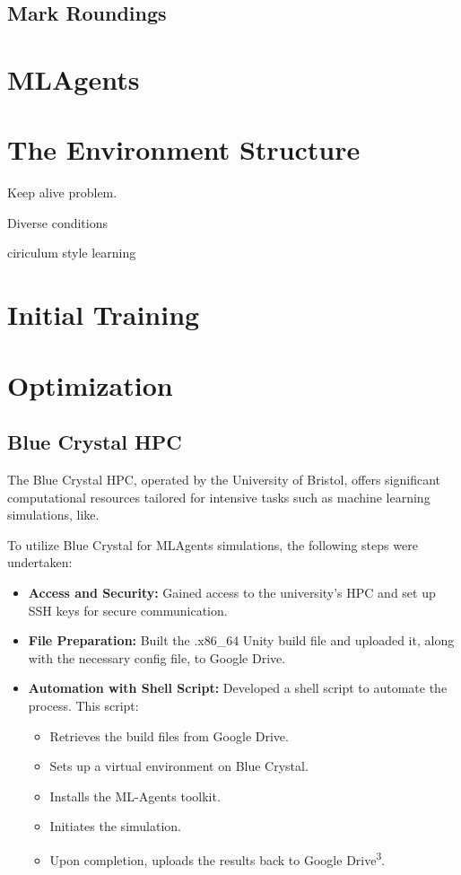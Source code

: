 \subsection{Mark Roundings}

\section{MLAgents}

\section{The Environment Structure}
Keep alive problem.

Diverse conditions

ciriculum style learning

\section{Initial Training}

\section{Optimization}

\subsection{Blue Crystal HPC}

The Blue Crystal HPC, operated by the University of Bristol, offers significant computational resources tailored for intensive tasks such as machine learning simulations, like.


To utilize Blue Crystal for MLAgents simulations, the following steps were undertaken:

\begin{itemize}
    \item \textbf{Access and Security:} Gained access to the university's HPC and set up SSH keys for secure communication.
    \item \textbf{File Preparation:} Built the .x86\_64 Unity build file and uploaded it, along with the necessary config file, to Google Drive.
    \item \textbf{Automation with Shell Script:} Developed a shell script to automate the process. This script:
    \begin{itemize}
        \item Retrieves the build files from Google Drive.
        \item Sets up a virtual environment on Blue Crystal.
        \item Installs the ML-Agents toolkit.
        \item Initiates the simulation.
        \item Upon completion, uploads the results back to Google Drive\textsuperscript{3}.
    \end{itemize}
\end{itemize}


